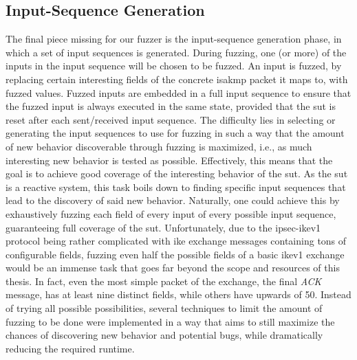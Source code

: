 \subsection{Input-Sequence Generation} \label{subsec:sequence_generation}
The final piece missing for our fuzzer is the input-sequence generation phase, in which a set of input sequences is generated. During fuzzing, one (or more) of the inputs in the input sequence will be chosen to be fuzzed. An input is fuzzed, by replacing certain interesting fields of the concrete \ac{isakmp} packet it maps to, with fuzzed values. Fuzzed inputs are embedded in a full input sequence to ensure that the fuzzed input is always executed in the same state, provided that the \ac{sut} is reset after each sent/received input sequence. The difficulty lies in selecting or generating the input sequences to use for fuzzing in such a way that the amount of new behavior discoverable through fuzzing is maximized, i.e., as much interesting new behavior is tested as possible. Effectively, this means that the goal is to achieve good coverage of the interesting behavior of the \ac{sut}. As the \ac{sut} is a reactive system, this task boils down to finding specific input sequences that lead to the discovery of said new behavior. Naturally, one could achieve this by exhaustively fuzzing each field of every input of every possible input sequence, guaranteeing full coverage of the \ac{sut}. Unfortunately, due to the \ac{ipsec}-\ac{ike}v1 protocol being rather complicated with \ac{ike} exchange messages containing tons of configurable fields, fuzzing even half the possible fields of a basic \ac{ike}v1 exchange would be an immense task that goes far beyond the scope and resources of this thesis. In fact, even the most simple packet of the exchange, the final \emph{ACK} message, has at least nine distinct fields, while others have upwards of 50. Instead of trying all possible possibilities, several techniques to limit the amount of fuzzing to be done were implemented in a way that aims to still maximize the chances of discovering new behavior and potential bugs, while dramatically reducing the required runtime. 

